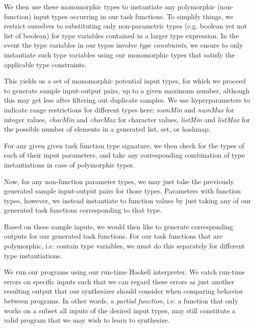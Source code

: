 \documentclass{article}
\begin{document}
We then use these monomorphic types to instantiate any polymorphic
(non-function) input types occurring in our task functions.
To simplify things, we restrict ourselves to substituting only non-parametric types (e.g. boolean yet not list of boolean) for type variables contained in a larger type expression.
In the event the type variables in our types involve \emph{type constraints},
we ensure to only instantiate such type variables using our monomorphic types that satisfy the applicable type constraints.

This yields us a set of monomorphic potential input types,
for which we proceed to generate sample input-output pairs,
up to a given maximum number,
although this may get less after filtering out duplicate samples.
We use hyperparameters to indicate range restrictions for different types here;
\emph{numMin} and \emph{numMax} for integer values,
\emph{charMin} and \emph{charMax} for character values,
\emph{listMin} and \emph{listMax} for the possible number of elements in a generated list, set, or hashmap.

For any given given task function type signature,
we then check for the types of each of their input parameters,
and take any corresponding combination of type instantiations in case of polymorphic types.

Now, for any non-function parameter types,
we may just take the previously generated sample input-output pairs for those types.
Parameters with function types, however,
we instead instantiate to function values by just taking
any of our generated task functions corresponding to that type.

Based on these sample inputs, we would then like to generate corresponding outputs for our generated task functions.
For our task functions that are polymorphic, i.e. contain type variables,
we must do this separately for different type instantiations.


We run our programs using our run-time Haskell interpreter.
We catch run-time errors on specific inputs such that
we can regard these errors as just another resulting output
that our synthesizer should consider when comparing behavior between programs.
In other words, a \emph{partial function},
i.e. a function that only works on a subset all inputs of the desired input types,
may still constitute a valid program that we may wish to learn to synthesize.
\end{document}
